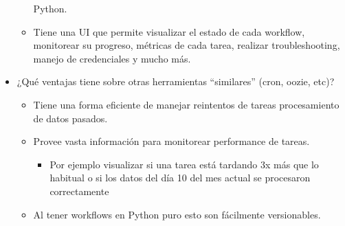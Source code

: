 \documentclass[leqno, 10pt, envcountsect]{beamer}
\numberwithin{equation}{section}
\theoremstyle{definition}
\theoremstyle{example}
\numberwithin{figure}{section}
\numberwithin{table}{section}
\let\olditem\item
\renewcommand{\item}{%
\olditem\vspace{1pt}}
\begin{document}
\begin{frame}[fragile=singleslide]
\begin{itemize}
\begin{itemize}
        Python.
      \item Tiene una UI que permite visualizar el estado de cada workflow,
        monitorear su progreso, métricas de cada tarea, realizar
        troubleshooting, manejo de credenciales y mucho más.
    \end{itemize}
  \item ¿Qué ventajas tiene sobre otras herramientas \enquote{similares} (cron, oozie,
    etc)?
    \begin{itemize}
      \item Tiene una forma eficiente de manejar reintentos de tareas procesamiento de datos pasados.
      \item Provee vasta información para monitorear performance de tareas.
        \begin{itemize}
          \item Por ejemplo visualizar si una tarea está tardando 3x más que lo habitual
          o si los datos del día 10 del mes actual se procesaron correctamente
        \end{itemize}
      \item Al tener workflows en Python puro esto son fácilmente versionables.
    \end{itemize}
  \end{itemize}
\end{frame}
\end{document}
